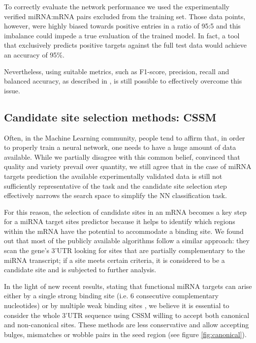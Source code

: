 To correctly evaluate the network performance we used the experimentally verified miRNA:mRNA pairs excluded from the training set. Those data points, however, were highly biased towards positive entries in a ratio of 95:5 and this imbalance could impede a true evaluation of the trained model. In fact, a tool that exclusively predicts positive targets against the full test data would achieve an accuracy of 95\%. 

Nevertheless, using suitable metrics, such as F1-score, precision, recall and balanced accuracy, as described in \cite{imbalanced}, is still possible to effectively overcome this issue.

\subsection{Candidate site selection methods: CSSM}
Often, in the Machine Learning community, people tend to affirm that, in order to properly train a neural network, one needs to have a huge amount of data available. While we partially disagree with this common belief, convinced that quality and variety prevail over quantity, we still agree that in the case of miRNA targets prediction the available experimentally validated data is still not sufficiently representative of the task and the candidate site selection step effectively narrows the search space to simplify the NN classification task.

For this reason, the selection of candidate sites in an mRNA becomes a key step for a miRNA target sites predictor because it helps to identify which regions within the mRNA have the potential to accommodate a binding site. We found out that most of the publicly available algorithms follow a similar approach: they scan the gene's 3'UTR  looking for sites that are partially complementary to the miRNA transcript; if a site meets certain criteria, it is considered to be a candidate site and is subjected to further analysis.

In the light of new recent results, stating that functional miRNA targets can arise either by a single strong binding site (i.e. 6 consecutive complementary nucleotides) or by multiple weak binding sites \cite{helwak}, we believe it is essential to consider the whole 3'UTR sequence using CSSM willing to accept both canonical and non-canonical sites. These methods are less conservative and allow accepting bulges, mismatches or wobble pairs in the seed region (see figure \ref{fig:canonical}).


